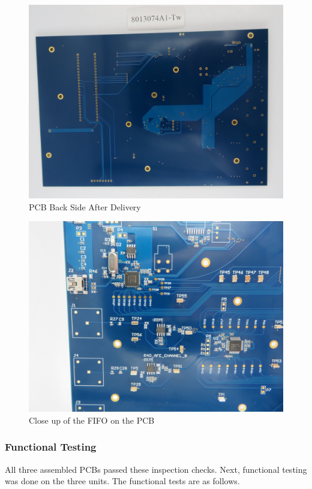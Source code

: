 \documentclass[letterpaper,11pt]{article}
\begin{document}
\begin{figure}[H]
  \centering
  \includegraphics[width=\textwidth]{figures/pcb-back.JPG}
  \caption{PCB Back Side After Delivery}
  \label{fig:pcb-back}
\end{figure}

\begin{figure}[H]
  \centering
  \includegraphics[width=\textwidth]{figures/pcb-closeup.JPG}
  \caption{Close up of the FIFO on the PCB}
  \label{fig:area-around-fifo}
\end{figure}

\subsubsection{Functional Testing}
All three assembled PCBs passed these inspection checks. Next, functional
testing was done on the three units. The functional tests are as follows.
\end{document}

